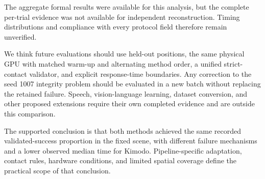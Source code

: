 \documentclass[11pt,a4paper]{article}
\begin{document}
The aggregate formal results were available for this analysis, but the complete per-trial evidence was not available for independent reconstruction. Timing distributions and compliance with every protocol field therefore remain unverified.

We think future evaluations should use held-out positions, the same physical GPU with matched warm-up and alternating method order, a unified strict-contact validator, and explicit response-time boundaries. Any correction to the seed 1007 integrity problem should be evaluated in a new batch without replacing the retained failure. Speech, vision-language learning, dataset conversion, and other proposed extensions require their own completed evidence and are outside this comparison.

The supported conclusion is that both methods achieved the same recorded validated-success proportion in the fixed scene, with different failure mechanisms and a lower observed median time for Kimodo. Pipeline-specific adaptation, contact rules, hardware conditions, and limited spatial coverage define the practical scope of that conclusion.
\end{document}
